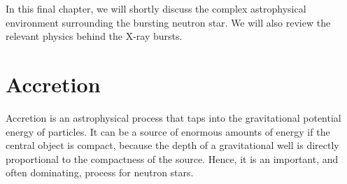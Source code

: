 In this final chapter, we will shortly discuss the complex astrophysical environment surrounding the bursting neutron star.
We will also review the relevant physics behind the X-ray bursts.


 
 
 




\section{Accretion}

Accretion is an astrophysical process that taps into the gravitational potential energy of particles.
It can be a source of enormous amounts of energy if the central object is compact, because the depth of a gravitational well is directly proportional to the compactness of the source.
Hence, it is an important, and often dominating, process for neutron stars.\cite[For an introduction, see e.g., ][]{FKR02}

